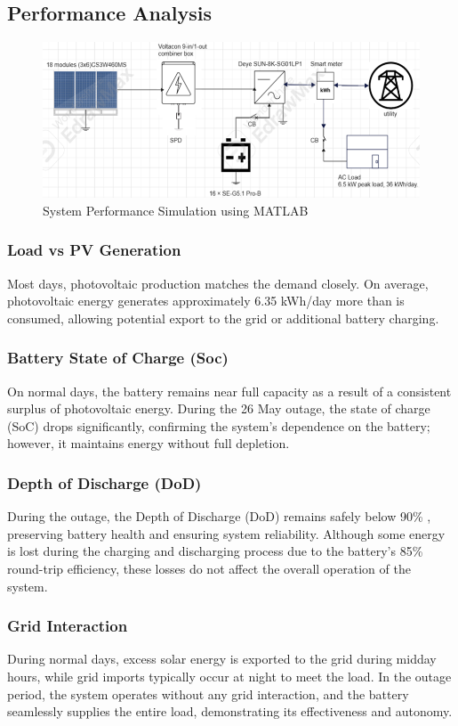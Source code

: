 \documentclass{article}
\begin{document}
\subsection{Performance Analysis}
\begin{figure}[H]
    \centering
    \includegraphics[width=1.\linewidth]{figures/Picture2.png}
    \caption{System Performance Simulation using MATLAB}
    \label{fig:placeholder}
\end{figure}
\subsubsection{Load vs PV Generation}
Most days, photovoltaic production matches the demand closely. On average, photovoltaic energy generates approximately 6.35 kWh/day more than is consumed, allowing potential export to the grid or additional battery charging.
\newpage
\subsubsection{Battery State of Charge (Soc)}
On normal days, the battery remains near full capacity as a result of a consistent surplus of photovoltaic energy.
During the 26 May outage, the state of charge (SoC) drops significantly, confirming the system's dependence on the battery; however, it maintains energy without full depletion.
\subsubsection{Depth of Discharge (DoD)}
During the outage, the Depth of Discharge (DoD) remains safely below 90\% , preserving battery health and ensuring system reliability. Although some energy is lost during the charging and discharging process due to the battery's 85\%  round-trip efficiency, these losses do not affect the overall operation of the system.
\subsubsection{Grid Interaction}
During normal days, excess solar energy is exported to the grid during midday hours, while grid imports typically occur at night to meet the load. In the outage period, the system operates without any grid interaction, and the battery seamlessly supplies the entire load, demonstrating its effectiveness and autonomy.
\end{document}
